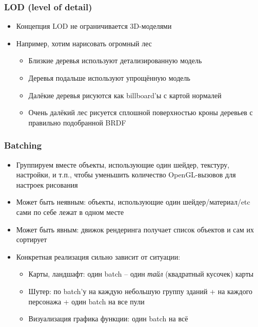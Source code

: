 \documentclass{beamer}
\begin{document}
\begin{frame}[fragile]
\frametitle{LOD (level of detail)}
\begin{itemize}
\item Концепция LOD не ограничивается 3D-моделями
\pause
\item Например, хотим нарисовать огромный лес
\pause
\begin{itemize}
\item Близкие деревья используют детализированную модель
\pause
\item Деревья подальше используют упрощённую модель
\pause
\item Далёкие деревья рисуются как billboard'ы с картой нормалей
\pause
\item Очень далёкий лес рисуется сплошной поверхностью кроны деревьев с правильно подобранной BRDF
\end{itemize}
\end{itemize}
\end{frame}

\begin{frame}[fragile]
\frametitle{Batching}
\begin{itemize}
\item Группируем вместе объекты, использующие один шейдер, текстуру, настройки, и т.п., чтобы уменьшить количество OpenGL-вызовов для настроек рисования
\pause
\item Может быть неявным: объекты, использующие один шейдер/материал/etc сами по себе лежат в одном месте
\pause
\item Может быть явным: движок рендеринга получает список объектов и сам их сортирует
\pause
\item Конкретная реализация сильно зависит от ситуации:
\pause
\begin{itemize}
\item Карты, ландшафт: один batch -- один \textit{тайл} (квадратный кусочек) карты
\pause
\item Шутер: по batch'у на каждую небольшую группу зданий + на каждого персонажа + один batch на все пули
\pause
\item Визуализация графика функции: один batch на всё
\end{itemize}
\end{itemize}
\end{frame}
\end{document}

